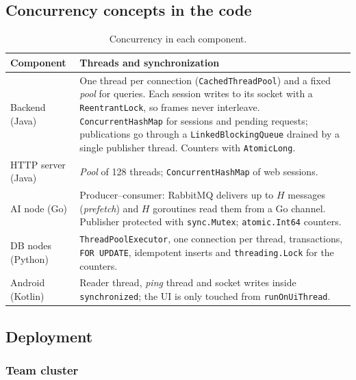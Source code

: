 \documentclass[10pt,a4paper]{article}
\begin{document}
\subsection{Concurrency concepts in the code}

\begin{table}[H]
\centering
\small
\begin{tabularx}{\textwidth}{p{3.3cm}Y}
\toprule
\textbf{Component} & \textbf{Threads and synchronization} \\
\midrule
Backend (Java) & One thread per connection (\texttt{CachedThreadPool}) and a fixed \textit{pool} for queries. Each session writes to its socket with a \texttt{ReentrantLock}, so frames never interleave. \texttt{ConcurrentHashMap} for sessions and pending requests; publications go through a \texttt{LinkedBlockingQueue} drained by a single publisher thread. Counters with \texttt{AtomicLong}. \\
HTTP server (Java) & \textit{Pool} of 128 threads; \texttt{ConcurrentHashMap} of web sessions. \\
AI node (Go) & Producer--consumer: RabbitMQ delivers up to $H$ messages (\textit{prefetch}) and $H$ goroutines read them from a Go channel. Publisher protected with \texttt{sync.Mutex}; \texttt{atomic.Int64} counters. \\
DB nodes (Python) & \texttt{ThreadPoolExecutor}, one connection per thread, transactions, \texttt{FOR UPDATE}, idempotent inserts and \texttt{threading.Lock} for the counters. \\
Android (Kotlin) & Reader thread, \textit{ping} thread and socket writes inside \texttt{synchronized}; the UI is only touched from \texttt{runOnUiThread}. \\
\bottomrule
\end{tabularx}
\caption{Concurrency in each component.}
\label{tab:conceptos}
\end{table}

\subsection{Deployment}

\subsubsection{Team cluster}
\end{document}
